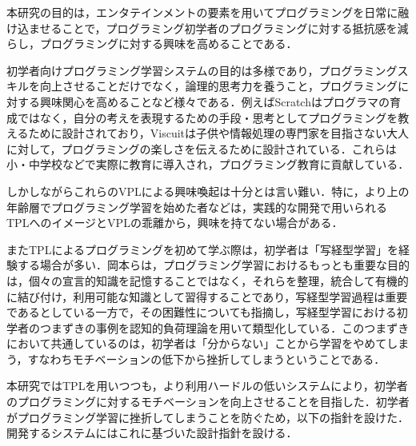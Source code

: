 


本研究の目的は，エンタテインメントの要素を用いてプログラミングを日常に融け込ませることで，プログラミング初学者のプログラミングに対する抵抗感を減らし，プログラミングに対する興味を高めることである．

初学者向けプログラミング学習システムの目的は多様であり，プログラミングスキルを向上させることだけでなく，論理的思考力を養うこと，プログラミングに対する興味関心を高めることなど様々である．例えばScratchはプログラマの育成ではなく，自分の考えを表現するための手段・思考としてプログラミングを教えるために設計されており，Viscuitは子供や情報処理の専門家を目指さない大人に対して，プログラミングの楽しさを伝えるために設計されている．これらは小・中学校などで実際に教育に導入され，プログラミング教育に貢献している．

しかしながらこれらのVPLによる興味喚起は十分とは言い難い．特に，より上の年齢層でプログラミング学習を始めた者などは，実践的な開発で用いられるTPLへのイメージとVPLの乖離から，興味を持てない場合がある．

またTPLによるプログラミングを初めて学ぶ際は，初学者は「写経型学習」を経験する場合が多い．岡本らは，プログラミング学習におけるもっとも重要な目的は，個々の宣言的知識を記憶することではなく，それらを整理，統合して有機的に結び付け，利用可能な知識として習得することであり，写経型学習過程は重要であるとしている一方で，その困難性についても指摘し，写経型学習における初学者のつまずきの事例を認知的負荷理論を用いて類型化している\cite{okamoto}．このつまずきにおいて共通しているのは，初学者は「分からない」ことから学習をやめてしまう，すなわちモチベーションの低下から挫折してしまうということである．

本研究ではTPLを用いつつも，より利用ハードルの低いシステムにより，初学者のプログラミングに対するモチベーションを向上させることを目指した．初学者がプログラミング学習に挫折してしまうことを防ぐため，以下の指針を設けた．開発するシステムにはこれに基づいた設計指針を設ける．


